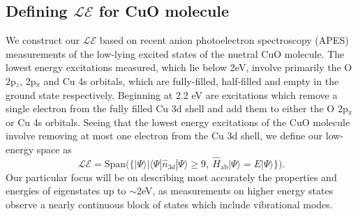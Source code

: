 \documentclass{article}
\begin{document}
\subsection{Defining $\mathcal{LE}$ for CuO molecule}
We construct our $\mathcal{LE}$ based on recent anion photoelectron spectroscopy (APES) measurements of the low-lying excited states of the nuetral CuO molecule. 
The lowest energy excitations measured, which lie below 2eV, involve primarily the O 2p$_z$, 2p$_\pi$ and Cu 4s orbitals, which are fully-filled, half-filled and empty in the ground state respectively.
Beginning at 2.2 eV are excitations which remove a single electron from the fully filled Cu 3d shell and add them to either the O 2p$_\pi$ or Cu 4s orbitals.
Seeing that the lowest energy excitations of the CuO molecule involve removing at most one electron from the Cu 3d shell, we define our low-energy space as
\begin{equation}
\mathcal{LE} = \text{Span(}\{ |\Psi \rangle | \langle \Psi | \hat{n}_{3d} | \Psi \rangle \ge 9,\ \hat{H}_\text{ab}|\Psi\rangle = E |\Psi\rangle \}\text{)}.
\label{eq:LE}
\end{equation}
Our particular focus will be on describing most accurately the properties and energies of eigenstates up to $\sim$2eV, as measurements on higher energy states observe a nearly continuous block of states which include vibrational modes.
\end{document}

